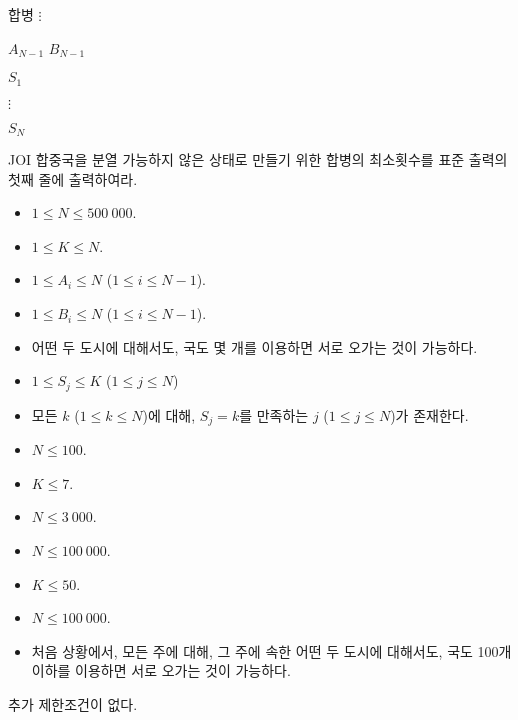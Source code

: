 \begin{problem}{합병}
	$\vdots$
	
	$A_{N-1}$ $B_{N-1}$
	
	$S_1$
	
	$\vdots$
	
	$S_N$
	
	\OutputFile
	
	JOI 합중국을 분열 가능하지 않은 상태로 만들기 위한 합병의 최소횟수를 표준 출력의 첫째 줄에 출력하여라.
		
	\Constraints
	
	\begin{itemize}
		\item $1 \le N \le 500\ 000$.
		\item $1 \le K \le N$.
		\item $1 \le A_i \le N$ ($1 \le i \le N-1$).
		\item $1 \le B_i \le N$ ($1 \le i \le N-1$).
		\item 어떤 두 도시에 대해서도, 국도 몇 개를 이용하면 서로 오가는 것이 가능하다.
		\item $1 \le S_j \le K$ ($1 \le j \le N$)
		\item 모든 $k$ ($1 \le k \le N$)에 대해, $S_j = k$를 만족하는 $j$ ($1 \le j \le N$)가 존재한다.
	\end{itemize}
	
	
	\begin{itemize}
		\item $N \le 100$.
		\item $K \le 7$.
	\end{itemize}


	\begin{itemize}
		\item $N \le 3\ 000$.
	\end{itemize}

	\begin{itemize}
		\item $N \le 100\ 000$.
		\item $K \le 50$.
	\end{itemize}


	\begin{itemize}
		\item $N \le 100\ 000$.
		\item 처음 상황에서, 모든 주에 대해, 그 주에 속한 어떤 두 도시에 대해서도, 국도 100개 이하를 이용하면 서로 오가는 것이 가능하다.
	\end{itemize}

	추가 제한조건이 없다.
	

\end{problem}
